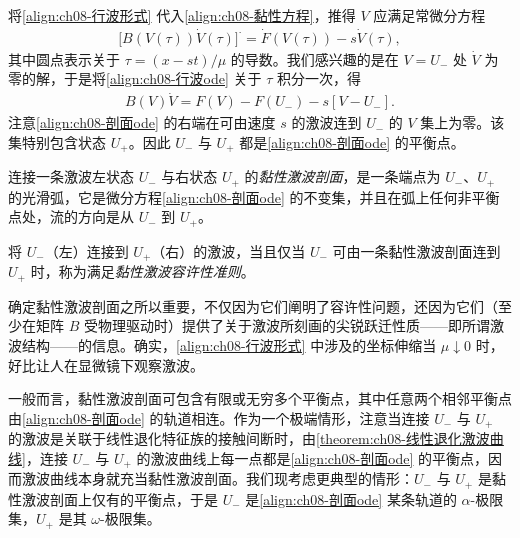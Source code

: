 \documentclass[../../main.tex]{subfiles}
\begin{document}
将\eqref{align:ch08-行波形式} 代入\eqref{align:ch08-黏性方程}，推得 $V$ 应满足常微分方程
\begin{align}
\big[B(V(\tau))\dot V(\tau)\big]^{\cdot}=\dot F(V(\tau))-s\dot V(\tau),
\label{align:ch08-行波ode}
\end{align}
其中圆点表示关于 $\tau=(x-st)/\mu$ 的导数。我们感兴趣的是在 $V=U_-$ 处 $\dot V$ 为零的解，于是将\eqref{align:ch08-行波ode} 关于 $\tau$ 积分一次，得
\begin{align}
B(V)\dot V=F(V)-F(U_-)-s[V-U_-].
\label{align:ch08-剖面ode}
\end{align}
注意\eqref{align:ch08-剖面ode} 的右端在可由速度 $s$ 的激波连到 $U_-$ 的 $V$ 集上为零。该集特别包含状态 $U_+$。因此 $U_-$ 与 $U_+$ 都是\eqref{align:ch08-剖面ode} 的平衡点。

连接一条激波左状态 $U_-$ 与右状态 $U_+$ 的\emph{黏性激波剖面}，是一条端点为 $U_-$、$U_+$ 的光滑弧，它是微分方程\eqref{align:ch08-剖面ode} 的不变集，并且在弧上任何非平衡点处，流的方向是从 $U_-$ 到 $U_+$。

将 $U_-$（左）连接到 $U_+$（右）的激波，当且仅当 $U_-$ 可由一条黏性激波剖面连到 $U_+$ 时，称为满足\emph{黏性激波容许性准则}。

确定黏性激波剖面之所以重要，不仅因为它们阐明了容许性问题，还因为它们（至少在矩阵 $B$ 受物理驱动时）提供了关于激波所刻画的尖锐跃迁性质——即所谓激波结构——的信息。确实，\eqref{align:ch08-行波形式} 中涉及的坐标伸缩当 $\mu\downarrow0$ 时，好比让人在显微镜下观察激波。

一般而言，黏性激波剖面可包含有限或无穷多个平衡点，其中任意两个相邻平衡点由\eqref{align:ch08-剖面ode} 的轨道相连。作为一个极端情形，注意当连接 $U_-$ 与 $U_+$ 的激波是关联于线性退化特征族的接触间断时，由\cref{theorem:ch08-线性退化激波曲线}，连接 $U_-$ 与 $U_+$ 的激波曲线上每一点都是\eqref{align:ch08-剖面ode} 的平衡点，因而激波曲线本身就充当黏性激波剖面。我们现考虑更典型的情形：$U_-$ 与 $U_+$ 是黏性激波剖面上仅有的平衡点，于是 $U_-$ 是\eqref{align:ch08-剖面ode} 某条轨道的 $\alpha$-极限集，$U_+$ 是其 $\omega$-极限集。
\end{document}
